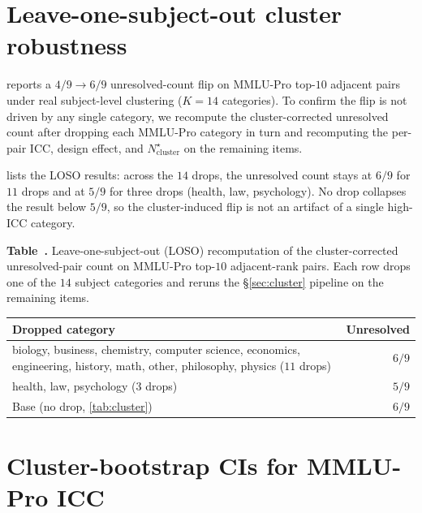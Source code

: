 \documentclass{article}
\theoremstyle{plain}
\theoremstyle{definition}
\begin{document}
\section{Leave-one-subject-out cluster robustness}
\label{app:loso}

 reports a $4/9\to 6/9$ unresolved-count flip on MMLU-Pro top-$10$ adjacent pairs under real subject-level clustering ($K{=}14$ categories). To confirm the flip is not driven by any single category, we recompute the cluster-corrected unresolved count after dropping each MMLU-Pro category in turn and recomputing the per-pair ICC, design effect, and $N^{\star}_{\mathrm{cluster}}$ on the remaining items.

 lists the LOSO results: across the $14$ drops, the unresolved count stays at $6/9$ for $11$ drops and at $5/9$ for three drops (health, law, psychology). No drop collapses the result below $5/9$, so the cluster-induced flip is not an artifact of a single high-ICC category.

\label{tab:loso}%
\begin{center}\footnotesize\vspace{-1ex}
\textbf{Table~\thetable.} Leave-one-subject-out (LOSO) recomputation of the cluster-corrected unresolved-pair count on MMLU-Pro top-$10$ adjacent-rank pairs. Each row drops one of the $14$ subject categories and reruns the \S\ref{sec:cluster} pipeline on the remaining items.\\[3pt]
\setlength{\tabcolsep}{4pt}
\begin{tabular}{@{}>{\raggedright\arraybackslash}p{}r@{}}
\toprule
Dropped category & Unresolved \\
\midrule
biology, business, chemistry, computer science, economics, engineering, history, math, other, philosophy, physics ($11$ drops) & $6/9$ \\
health, law, psychology ($3$ drops) & $5/9$ \\
\midrule
Base (no drop, \cref{tab:cluster}) & $6/9$ \\
\bottomrule
\end{tabular}
\end{center}

\section{Cluster-bootstrap CIs for MMLU-Pro ICC}
\label{app:icc_bootstrap}
\end{document}
